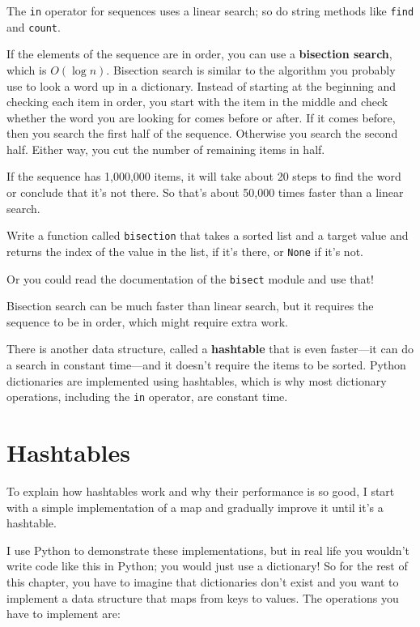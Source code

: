 \documentclass[10pt]{book}
\begin{document}
The {\tt in} operator for sequences uses a linear search; so do string
methods like {\tt find} and {\tt count}.

If the elements of the sequence are in order, you can use a {\bf
  bisection search}, which is $O(\log n)$.  Bisection search is
similar to the algorithm you probably use to look a word up in a
dictionary.  Instead of starting at the beginning and checking each
item in order, you start with the item in the middle and check whether
the word you are looking for comes before or after.  If it comes
before, then you search the first half of the sequence.
Otherwise you search the second half.  Either way, you cut the number
of remaining items in half.

If the sequence has 1,000,000 items, it will take about 20 steps to
find the word or conclude that it's not there.  So that's about 50,000
times faster than a linear search.

\begin{ex}

Write a function called {\tt bisection} that takes a sorted list
and a target value and returns the index of the value
in the list, if it's there, or {\tt None} if it's not.


Or you could read the documentation of the {\tt bisect} module
and use that!

\end{ex}

Bisection search can be much faster than linear search, but
it requires the sequence to be in order, which might require
extra work.

There is another data structure, called a {\bf hashtable} that
is even faster---it can do a search in constant time---and it
doesn't require the items to be sorted.  Python dictionaries
are implemented using hashtables, which is why most dictionary
operations, including the {\tt in} operator, are constant time.


\section{Hashtables}
\label{hashtable}

To explain how hashtables work and why their performance is so
good, I start with a simple implementation of a map and
gradually improve it until it's a hashtable.

I use Python to demonstrate these implementations, but in real
life you wouldn't write code like this in Python; you would just use a
dictionary!  So for the rest of this chapter, you have to imagine that
dictionaries don't exist and you want to implement a data structure
that maps from keys to values.  The operations you have to
implement are:
\end{document}
